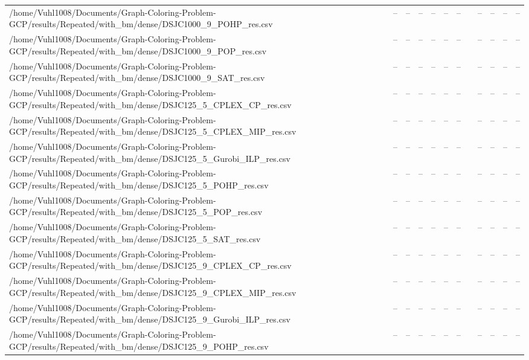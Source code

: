 \begin{table}[htbp]
\begin{tabular}{llllllllllll}
/home/Vuhl1008/Documents/Graph-Coloring-Problem-GCP/results/Repeated/with\_bm/dense/DSJC1000\_9\_POHP\_res.csv & -- & -- & -- & -- & -- & -- & {} & -- & -- & -- & -- \\
/home/Vuhl1008/Documents/Graph-Coloring-Problem-GCP/results/Repeated/with\_bm/dense/DSJC1000\_9\_POP\_res.csv & -- & -- & -- & -- & -- & -- & {} & -- & -- & -- & -- \\
/home/Vuhl1008/Documents/Graph-Coloring-Problem-GCP/results/Repeated/with\_bm/dense/DSJC1000\_9\_SAT\_res.csv & -- & -- & -- & -- & -- & -- & {} & -- & -- & -- & -- \\
/home/Vuhl1008/Documents/Graph-Coloring-Problem-GCP/results/Repeated/with\_bm/dense/DSJC125\_5\_CPLEX\_CP\_res.csv & -- & -- & -- & -- & -- & -- & {} & -- & -- & -- & -- \\
/home/Vuhl1008/Documents/Graph-Coloring-Problem-GCP/results/Repeated/with\_bm/dense/DSJC125\_5\_CPLEX\_MIP\_res.csv & -- & -- & -- & -- & -- & -- & {} & -- & -- & -- & -- \\
/home/Vuhl1008/Documents/Graph-Coloring-Problem-GCP/results/Repeated/with\_bm/dense/DSJC125\_5\_Gurobi\_ILP\_res.csv & -- & -- & -- & -- & -- & -- & {} & -- & -- & -- & -- \\
/home/Vuhl1008/Documents/Graph-Coloring-Problem-GCP/results/Repeated/with\_bm/dense/DSJC125\_5\_POHP\_res.csv & -- & -- & -- & -- & -- & -- & {} & -- & -- & -- & -- \\
/home/Vuhl1008/Documents/Graph-Coloring-Problem-GCP/results/Repeated/with\_bm/dense/DSJC125\_5\_POP\_res.csv & -- & -- & -- & -- & -- & -- & {} & -- & -- & -- & -- \\
/home/Vuhl1008/Documents/Graph-Coloring-Problem-GCP/results/Repeated/with\_bm/dense/DSJC125\_5\_SAT\_res.csv & -- & -- & -- & -- & -- & -- & {} & -- & -- & -- & -- \\
/home/Vuhl1008/Documents/Graph-Coloring-Problem-GCP/results/Repeated/with\_bm/dense/DSJC125\_9\_CPLEX\_CP\_res.csv & -- & -- & -- & -- & -- & -- & {} & -- & -- & -- & -- \\
/home/Vuhl1008/Documents/Graph-Coloring-Problem-GCP/results/Repeated/with\_bm/dense/DSJC125\_9\_CPLEX\_MIP\_res.csv & -- & -- & -- & -- & -- & -- & {} & -- & -- & -- & -- \\
/home/Vuhl1008/Documents/Graph-Coloring-Problem-GCP/results/Repeated/with\_bm/dense/DSJC125\_9\_Gurobi\_ILP\_res.csv & -- & -- & -- & -- & -- & -- & {} & -- & -- & -- & -- \\
/home/Vuhl1008/Documents/Graph-Coloring-Problem-GCP/results/Repeated/with\_bm/dense/DSJC125\_9\_POHP\_res.csv & -- & -- & -- & -- & -- & -- & {} & -- & -- & -- & -- \\

\end{tabular}
\end{table}
